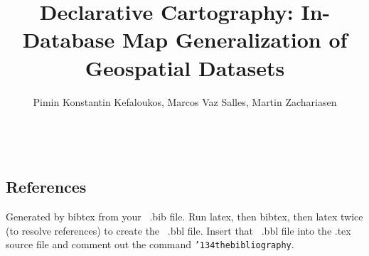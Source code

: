 \documentclass{vldb}
\begin{document}
\title{Declarative Cartography: In-Database Map Generalization of Geospatial Datasets}



\author{
\alignauthor
Pimin Konstantin Kefaloukos\footnotemark[2] \footnotemark[3] \footnotemark[4], Marcos Vaz Salles\footnotemark[2] , Martin Zachariasen\footnotemark[2]\\\vspace{1ex}
       \\
       \\\vspace{1ex}
}


\maketitle


\begin{abstract}
\end{abstract}























\subsection{References}
Generated by bibtex from your ~.bib file.  Run latex,
then bibtex, then latex twice (to resolve references)
to create the ~.bbl file.  Insert that ~.bbl file into
the .tex source file and comment out
the command \texttt{{\char'134}thebibliography}.
\end{document}
